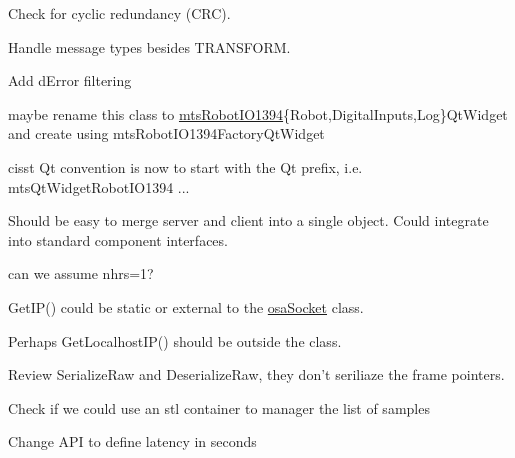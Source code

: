 \begin{DoxyRefList}
Check for cyclic redundancy (C\-R\-C). 

Handle message types besides T\-R\-A\-N\-S\-F\-O\-R\-M.  
\item[\label{todo__todo000016}%
\hypertarget{todo__todo000016}{}%
File \hyperlink{mts_p_i_d_8h}{mts\-P\-I\-D.h} ]Add d\-Error filtering  
\item[\label{todo__todo000021}%
\hypertarget{todo__todo000021}{}%
Class \hyperlink{classmts_robot_i_o1394_qt_widget}{mts\-Robot\-I\-O1394\-Qt\-Widget} ]maybe rename this class to \hyperlink{classmts_robot_i_o1394}{mts\-Robot\-I\-O1394}\{Robot,Digital\-Inputs,Log\}Qt\-Widget and create using mts\-Robot\-I\-O1394\-Factory\-Qt\-Widget 

cisst Qt convention is now to start with the Qt prefix, i.\-e. mts\-Qt\-Widget\-Robot\-I\-O1394 ...  
\item[\label{todo__todo000017}%
\hypertarget{todo__todo000017}{}%
Class \hyperlink{classmts_tele_operation}{mts\-Tele\-Operation} ]
\item[\label{todo__todo000010}%
\hypertarget{todo__todo000010}{}%
Class \hyperlink{classmts_watchdog_server}{mts\-Watchdog\-Server} ]Should be easy to merge server and client into a single object. Could integrate into standard component interfaces.  
\item[\label{todo__todo000012}%
\hypertarget{todo__todo000012}{}%
Member \hyperlink{classnmr_l_sq_lin_solution_dynamic_aed03cb7a228712334f74181aed1cb7f3}{nmr\-L\-Sq\-Lin\-Solution\-Dynamic\-:\-:Query\-Workspace\-Size\-\_\-\-L\-S} (size\-\_\-t ma, size\-\_\-t n)]can we assume nhrs=1?  
\item[\label{todo__todo000007}%
\hypertarget{todo__todo000007}{}%
File \hyperlink{osa_socket_8h}{osa\-Socket.h} ]Get\-I\-P() could be static or external to the \hyperlink{classosa_socket}{osa\-Socket} class. 

Perhaps Get\-Localhost\-I\-P() should be outside the class.  
\item[\label{todo__todo000011}%
\hypertarget{todo__todo000011}{}%
Class \hyperlink{classprm_velocity_cartesian_set}{prm\-Velocity\-Cartesian\-Set} ]Review Serialize\-Raw and Deserialize\-Raw, they don't seriliaze the frame pointers.  
\item[\label{todo__todo000013}%
\hypertarget{todo__todo000013}{}%
Class \hyperlink{classsvl_filter_add_latency}{svl\-Filter\-Add\-Latency} ]Check if we could use an stl container to manager the list of samples 

Change A\-P\-I to define latency in seconds 


\end{DoxyRefList}
